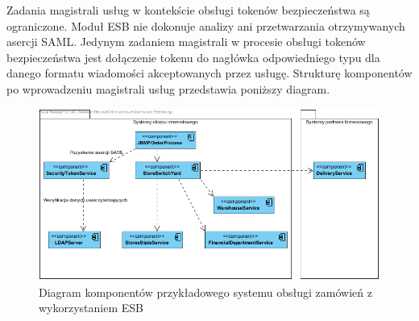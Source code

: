 		Zadania magistrali usług w kontekście obsługi tokenów bezpieczeństwa są ograniczone. Moduł ESB nie dokonuje analizy ani przetwarzania otrzymywanych asercji SAML. Jedynym zadaniem magistrali w procesie obsługi tokenów bezpieczeństwa jest dołączenie tokenu do nagłówka odpowiedniego typu dla danego formatu wiadomości akceptowanych przez usługę.
		Strukturę komponentów po wprowadzeniu magistrali usług przedstawia poniższy diagram.

		\begin{figure}[h]
			\centering
			\includegraphics{img/KomponentySystemuESB.png}
			\caption{Diagram komponentów przykładowego systemu obsługi zamówień z wykorzystaniem ESB}
			\label{KomponentyESB}
		\end{figure}
		
